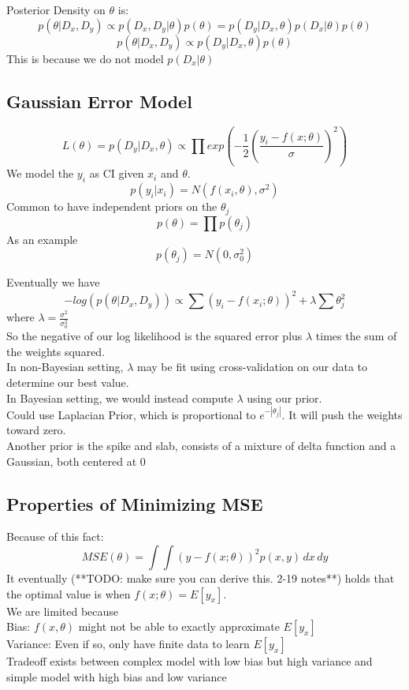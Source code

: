 \documentclass[11pt,psfig]{article}
\begin{document}
Posterior Density on $\theta$ is: 
\[
p(\theta|D_x,D_y) \propto p(D_x,D_y|\theta)p(\theta) = p(D_y|D_x,\theta)p(D_x|\theta)p(\theta)
\]
\[
p(\theta|D_x,D_y) \propto p(D_y|D_x,\theta)p(\theta)
\]
This is because we do not model $p(D_x|\theta)$

\subsection*{Gaussian Error Model}

\[
L(\theta) = p(D_y|D_x,\theta) \propto \prod{exp(-\frac{1}{2}(\frac{y_i-f(x;\theta)}{\sigma})^2)}
\]
We model the $y_i$ as CI given $x_i$ and $\theta$. 
\[
p(y_i|x_i) = N( f(x_i,\theta), \sigma^2)
\]
Common to have independent priors on the $\theta_j$
\[
p(\theta) = \prod{p(\theta_j)}
\]
As an example
\[
p(\theta_j) = N(0,\sigma_0^2)
\]

Eventually we have
\[
-log(p(\theta|D_x,D_y)) \propto \sum{(y_i - f(x_i;\theta))^2} + \lambda \sum{\theta_j^2}
\]
where $\lambda = \frac{\sigma^2}{\sigma_0^2}$\\
So the negative of our log likelihood is the squared error plus $\lambda$ times the sum of the weights squared. \\
In non-Bayesian setting, $\lambda$ may be fit using cross-validation on our data to determine our best value. 
\\
In Bayesian setting, we would instead compute $\lambda$ using our prior. 
\\
Could use Laplacian Prior, which is proportional to $e^{-|\theta_j|}$. It will push the weights toward zero.\\
Another prior is the spike and slab, consists of a mixture of delta function and a Gaussian, both centered at 0

\subsection*{Properties of Minimizing MSE}

Because of this fact:
\[
MSE(\theta) = \int{\int{(y-f(x;\theta))^2 p(x,y)\,dx}\,dy}
\]
It eventually (**TODO: make sure you can derive this. 2-19 notes**) holds that the optimal value is when $f(x;\theta)=E[y_x]$. \\
We are limited because\\
Bias: $f(x,\theta)$ might not be able to exactly approximate $E[y_x]$\\
Variance: Even if so, only have finite data to learn $E[y_x]$\\
Tradeoff exists between complex model with low bias but high variance and \\
simple model with high bias and low variance
\end{document}
